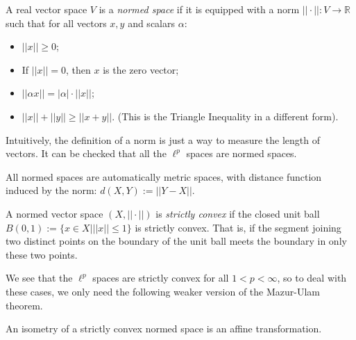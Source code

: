 \documentclass{mystyle}
\begin{document}
\begin{definition}
    A real vector space $V$ is a \textit{normed space} if it is equipped with a norm $||\cdot||: V \to \mathbb{R}$ such that for all vectors $x,y$ and scalars $\alpha$:
    \begin{itemize}
        \item $||x|| \ge 0$;
        \item If $||x|| = 0$, then $x$ is the zero vector;
        \item $||\alpha x|| = |\alpha| \cdot ||x||$;
        \item $||x|| + ||y|| \ge ||x+y||$. (This is the Triangle Inequality in a different form).
    \end{itemize}
\end{definition}
Intuitively, the definition of a norm is just a way to measure the length of vectors. It can be checked that all the $\ell^p$ spaces are normed spaces.
\begin{remark}
    All normed spaces are automatically metric spaces, with distance function induced by the norm: $d(X,Y) := ||Y-X||$.
\end{remark}
\begin{definition}\label{strict_convex_def}
    A normed vector space $(X, || \cdot ||)$ is \textit{strictly convex} if the closed unit ball $B(0, 1) := \{x \in X| ||x|| \leq 1\}$ is strictly convex. That is, if the segment joining two distinct points on the boundary of the unit ball meets the boundary in only these two points. 
\end{definition}
We see that the $\ell^p$ spaces are strictly convex for all $1 < p < \infty$, so to deal with these cases, we only need the following weaker version of the Mazur-Ulam theorem.
\begin{theorem}\label{thm_mazur_ulam}
    An isometry of a strictly convex normed space is an affine transformation. 
\end{theorem}
\end{document}
